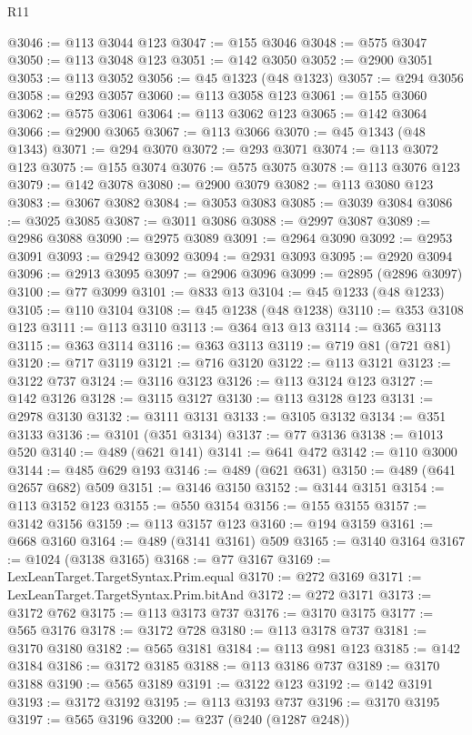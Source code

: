 \begin{lexlean}{R11}
\begin{coremodule}
@3046 := @113 @3044 @123
@3047 := @155 @3046
@3048 := @575 @3047
@3050 := @113 @3048 @123
@3051 := @142 @3050
@3052 := @2900 @3051
@3053 := @113 @3052
@3056 := @45 @1323 (@48 @1323)
@3057 := @294 @3056
@3058 := @293 @3057
@3060 := @113 @3058 @123
@3061 := @155 @3060
@3062 := @575 @3061
@3064 := @113 @3062 @123
@3065 := @142 @3064
@3066 := @2900 @3065
@3067 := @113 @3066
@3070 := @45 @1343 (@48 @1343)
@3071 := @294 @3070
@3072 := @293 @3071
@3074 := @113 @3072 @123
@3075 := @155 @3074
@3076 := @575 @3075
@3078 := @113 @3076 @123
@3079 := @142 @3078
@3080 := @2900 @3079
@3082 := @113 @3080 @123
@3083 := @3067 @3082
@3084 := @3053 @3083
@3085 := @3039 @3084
@3086 := @3025 @3085
@3087 := @3011 @3086
@3088 := @2997 @3087
@3089 := @2986 @3088
@3090 := @2975 @3089
@3091 := @2964 @3090
@3092 := @2953 @3091
@3093 := @2942 @3092
@3094 := @2931 @3093
@3095 := @2920 @3094
@3096 := @2913 @3095
@3097 := @2906 @3096
@3099 := @2895 (@2896 @3097)
@3100 := @77 @3099
@3101 := @833 @13
@3104 := @45 @1233 (@48 @1233)
@3105 := @110 @3104
@3108 := @45 @1238 (@48 @1238)
@3110 := @353 @3108 @123
@3111 := @113 @3110
@3113 := @364 @13 @13
@3114 := @365 @3113
@3115 := @363 @3114
@3116 := @363 @3113
@3119 := @719 @81 (@721 @81)
@3120 := @717 @3119
@3121 := @716 @3120
@3122 := @113 @3121
@3123 := @3122 @737
@3124 := @3116 @3123
@3126 := @113 @3124 @123
@3127 := @142 @3126
@3128 := @3115 @3127
@3130 := @113 @3128 @123
@3131 := @2978 @3130
@3132 := @3111 @3131
@3133 := @3105 @3132
@3134 := @351 @3133
@3136 := @3101 (@351 @3134)
@3137 := @77 @3136
@3138 := @1013 @520
@3140 := @489 (@621 @141)
@3141 := @641 @472
@3142 := @110 @3000
@3144 := @485 @629 @193
@3146 := @489 (@621 @631)
@3150 := @489 (@641 @2657 @682) @509
@3151 := @3146 @3150
@3152 := @3144 @3151
@3154 := @113 @3152 @123
@3155 := @550 @3154
@3156 := @155 @3155
@3157 := @3142 @3156
@3159 := @113 @3157 @123
@3160 := @194 @3159
@3161 := @668 @3160
@3164 := @489 (@3141 @3161) @509
@3165 := @3140 @3164
@3167 := @1024 (@3138 @3165)
@3168 := @77 @3167
@3169 := LexLeanTarget.TargetSyntax.Prim.equal
@3170 := @272 @3169
@3171 := LexLeanTarget.TargetSyntax.Prim.bitAnd
@3172 := @272 @3171
@3173 := @3172 @762
@3175 := @113 @3173 @737
@3176 := @3170 @3175
@3177 := @565 @3176
@3178 := @3172 @728
@3180 := @113 @3178 @737
@3181 := @3170 @3180
@3182 := @565 @3181
@3184 := @113 @981 @123
@3185 := @142 @3184
@3186 := @3172 @3185
@3188 := @113 @3186 @737
@3189 := @3170 @3188
@3190 := @565 @3189
@3191 := @3122 @123
@3192 := @142 @3191
@3193 := @3172 @3192
@3195 := @113 @3193 @737
@3196 := @3170 @3195
@3197 := @565 @3196
@3200 := @237 (@240 (@1287 @248))

\end{coremodule}
\end{lexlean}
